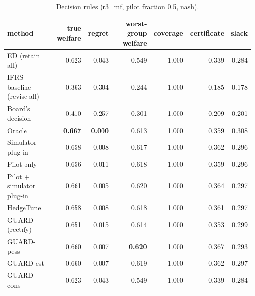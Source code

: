 \begin{table}[t]
\centering
\small
\begin{tabular}{lrrrrrr}
\toprule
method & true welfare & regret & worst-group welfare & coverage & certificate & slack \\
\midrule
ED (retain all) & 0.623 & 0.043 & 0.549 & 1.000 & 0.339 & 0.284 \\
IFRS baseline (revise all) & 0.363 & 0.304 & 0.244 & 1.000 & 0.185 & 0.178 \\
Board's decision & 0.410 & 0.257 & 0.301 & 1.000 & 0.209 & 0.201 \\
Oracle & \textbf{0.667} & \textbf{0.000} & 0.613 & 1.000 & 0.359 & 0.308 \\
Simulator plug-in & 0.658 & 0.008 & 0.617 & 1.000 & 0.362 & 0.296 \\
Pilot only & 0.656 & 0.011 & 0.618 & 1.000 & 0.359 & 0.296 \\
Pilot + simulator plug-in & 0.661 & 0.005 & 0.620 & 1.000 & 0.364 & 0.297 \\
HedgeTune & 0.658 & 0.008 & 0.618 & 1.000 & 0.361 & 0.297 \\
GUARD (rectify) & 0.651 & 0.015 & 0.614 & 1.000 & 0.353 & 0.299 \\
GUARD-pess & 0.660 & 0.007 & \textbf{0.620} & 1.000 & 0.367 & 0.293 \\
GUARD-est & 0.660 & 0.007 & 0.619 & 1.000 & 0.362 & 0.297 \\
GUARD-cons & 0.623 & 0.043 & 0.549 & 1.000 & 0.339 & 0.284 \\
\bottomrule
\end{tabular}
\caption{Decision rules (r3\_mf, pilot fraction 0.5, nash).}
\label{tab:methods-nash}
\end{table}
